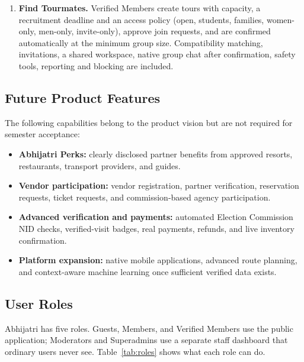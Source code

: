 \documentclass[11pt,a4paper]{article}
\begin{document}
\begin{enumerate}
  \item \textbf{Find Tourmates.} Verified Members create tours with capacity, a recruitment deadline and an access policy (open, students, families, women-only, men-only, invite-only), approve join requests, and are confirmed automatically at the minimum group size. Compatibility matching, invitations, a shared workspace, native group chat after confirmation, safety tools, reporting and blocking are included.
\end{enumerate}

\subsection{Future Product Features}
The following capabilities belong to the product vision but are not required for semester acceptance:
\begin{itemize}
  \item \textbf{Abhijatri Perks:} clearly disclosed partner benefits from approved resorts, restaurants, transport providers, and guides.
  \item \textbf{Vendor participation:} vendor registration, partner verification, reservation requests, ticket requests, and commission-based agency participation.
  \item \textbf{Advanced verification and payments:} automated Election Commission NID checks, verified-visit badges, real payments, refunds, and live inventory confirmation.
  \item \textbf{Platform expansion:} native mobile applications, advanced route planning, and context-aware machine learning once sufficient verified data exists.
\end{itemize}

\clearpage
\subsection{User Roles}
Abhijatri has five roles. Guests, Members, and Verified Members use the public application; Moderators and Superadmins use a separate staff dashboard that ordinary users never see. Table~\ref{tab:roles} shows what each role can do.
\end{document}
